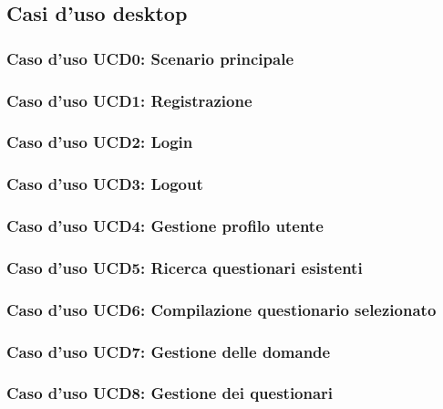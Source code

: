 \subsection{Casi d'uso desktop}

\subsubsection{Caso d'uso UCD0: Scenario principale}

\subsubsection{Caso d'uso UCD1: Registrazione}

\subsubsection{Caso d'uso UCD2: Login}

\subsubsection{Caso d'uso UCD3: Logout}

\subsubsection{Caso d'uso UCD4: Gestione profilo utente}

\subsubsection{Caso d'uso UCD5: Ricerca questionari esistenti}

\subsubsection{Caso d'uso UCD6: Compilazione questionario selezionato}

\subsubsection{Caso d'uso UCD7: Gestione delle domande}

\subsubsection{Caso d'uso UCD8: Gestione dei questionari}